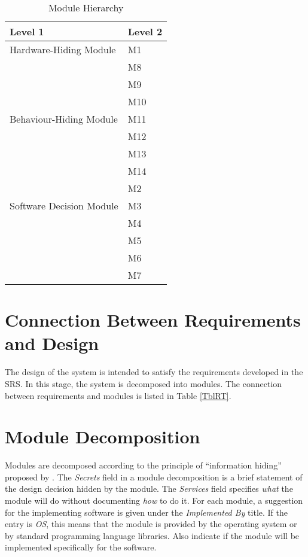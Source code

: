 \documentclass[12pt, titlepage]{article}
\begin{document}
\begin{table}[h!]
\centering
\begin{tabular}{p{} p{}}
\toprule
\textbf{Level 1} & \textbf{Level 2}\\
\midrule

{Hardware-Hiding Module} 
& M1 \\
\midrule

\multirow{7}{0.3\textwidth}{Behaviour-Hiding Module} 
& M8\\
& M9\\
& M10\\
& M11\\
& M12\\
& M13\\
& M14\\ 
\midrule

\multirow{3}{0.3\textwidth}{Software Decision Module} 
& M2\\
& M3\\
& M4\\
& M5\\
& M6\\
& M7\\
\bottomrule

\end{tabular}
\caption{Module Hierarchy}
\label{TblMH}
\end{table}

\section{Connection Between Requirements and Design} \label{SecConnection}

The design of the system is intended to satisfy the requirements developed in
the SRS. In this stage, the system is decomposed into modules. The connection
between requirements and modules is listed in Table \ref{TblRT}.

\section{Module Decomposition} \label{SecMD}

Modules are decomposed according to the principle of ``information hiding''
proposed by \citet{ParnasEtAl1984}. The \emph{Secrets} field in a module
decomposition is a brief statement of the design decision hidden by the
module. The \emph{Services} field specifies \emph{what} the module will do
without documenting \emph{how} to do it. For each module, a suggestion for the
implementing software is given under the \emph{Implemented By} title. If the
entry is \emph{OS}, this means that the module is provided by the operating
system or by standard programming language libraries.  Also indicate if the
module will be implemented specifically for the software.
\end{document}
